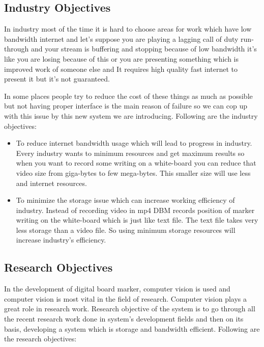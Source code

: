 \subsection{Industry Objectives}
In industry most of the time it is hard to choose areas for work which have low bandwidth internet and let's suppose you are playing a lagging call of duty run-through and your stream is buffering and stopping because of low bandwidth it's like you are losing because of this or you are presenting something which is improved work of someone else and It requires high quality fast internet to present it but it's not guaranteed.
\par In some places people try to reduce the cost of these things as much as possible but not having proper interface is the main reason of failure so we can cop up with this issue by this new system we are introducing.
Following are the industry objectives:

\begin{itemize}

\item To reduce internet bandwidth usage which will lead to progress in industry. Every industry wants to minimum resources and get maximum results so when you want to record some writing on a white-board you can reduce that video size from giga-bytes to few mega-bytes. This smaller size will use less and internet resources.
\item To minimize the storage issue which can increase working efficiency of industry. Instead of recording video in mp4 DBM records position of marker writing on the white-board which is just like text file. The text file takes very less storage than a video file. So using minimum storage resources will increase industry's efficiency.

\end{itemize}

\bigskip

\subsection{Research Objectives}
In the development of digital board marker, computer vision is used and computer vision is most vital in the field of research. Computer vision plays a great role in research work. Research objective of the system is to go through all the recent research work done in system's development fields and then on its basis, developing a system which is storage and bandwidth efficient. Following are the research objectives:


